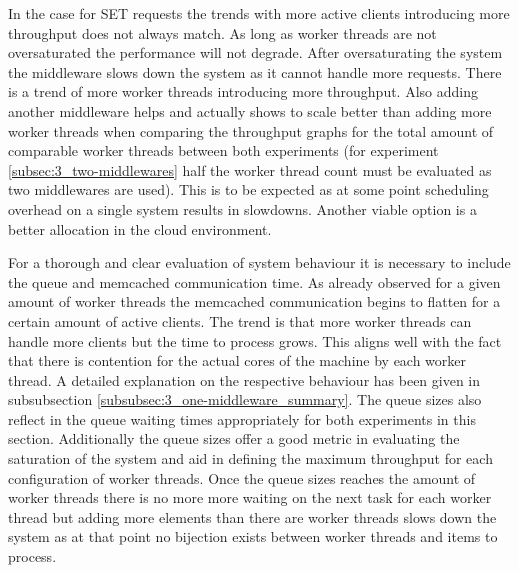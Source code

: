         In the case for SET requests the trends with more active clients introducing more throughput does not always
        match. As long as worker threads are not oversaturated the performance will not degrade. After oversaturating
        the system the middleware slows down the system as it cannot handle more requests. There is a trend of more
        worker threads introducing more throughput. Also adding another middleware helps and actually shows to scale
        better than adding more worker threads when comparing the throughput graphs for the total amount of comparable
        worker threads between both experiments (for experiment \ref{subsec:3_two-middlewares} half the worker thread
        count must be evaluated as two middlewares are used). This is to be expected as at some point scheduling
        overhead on a single system results in slowdowns. Another viable option is a better allocation in the cloud
        environment.

        For a thorough and clear evaluation of system behaviour it is necessary to include the queue and memcached
        communication time.\newline
        As already observed for a given amount of worker threads the memcached communication begins to flatten for a
        certain amount of active clients. The trend is that more worker threads can handle more clients but the time to
        process grows. This aligns well with the fact that there is contention for the actual cores of the machine by
        each worker thread. A detailed explanation on the respective behaviour has been given in
        subsubsection \ref{subsubsec:3_one-middleware_summary}. The queue sizes also reflect in the queue waiting times
        appropriately for both experiments in this section. Additionally the queue sizes offer a good metric in
        evaluating the saturation of the system and aid in defining the maximum throughput for each configuration of
        worker threads. Once the queue sizes reaches the amount of worker threads there is no more more waiting on the
        next task for each worker thread but adding more elements than there are worker threads slows down the system as
        at that point no bijection exists between worker threads and items to process.


